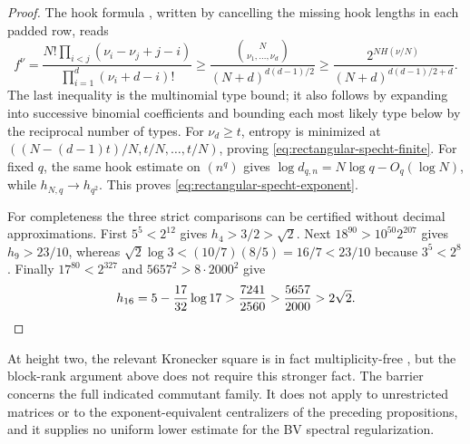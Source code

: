 \begin{proof}
The hook formula \cite[Section~1, pp.~1--2]{Stanley2004rectangular},
written by cancelling the missing hook lengths in each padded row, reads
\[
 f^\nu=
 \frac{N!\prod_{i<j}(\nu_i-\nu_j+j-i)}
      {\prod_{i=1}^d(\nu_i+d-i)!}
 \ge\frac{\binom{N}{\nu_1,\ldots,\nu_d}}
            {(N+d)^{d(d-1)/2}}
 \ge\frac{2^{NH(\nu/N)}}{(N+d)^{d(d-1)/2+d}}.
\]
The last inequality is the multinomial type bound; it also follows
by expanding into successive binomial coefficients and bounding
each most likely type below by the reciprocal number of types.
For $\nu_d\ge t$, entropy is minimized at
$((N-(d-1)t)/N,t/N,\ldots,t/N)$, proving
\eqref{eq:rectangular-specht-finite}.
For fixed $q$, the same hook estimate on $(n^q)$ gives
$\log d_{q,n}=N\log q-O_q(\log N)$, while
$h_{N,q}\to h_{q^2}$. This proves
\eqref{eq:rectangular-specht-exponent}.

For completeness the three strict comparisons can be certified
without decimal approximations. First $5^5<2^{12}$ gives
$h_4>3/2>\sqrt2$. Next
$18^{90}>10^{50}2^{207}$ gives $h_9>23/10$, whereas
$\sqrt2\log3<(10/7)(8/5)=16/7<23/10$ because $3^5<2^8$.
Finally $17^{80}<2^{327}$ and $5657^2>8\cdot2000^2$ give
\[
 h_{16}=5-\frac{17}{32}\log17
   >\frac{7241}{2560}>\frac{5657}{2000}>2\sqrt2.\qedhere
\]
\end{proof}

At height two, the relevant Kronecker square is in fact
multiplicity-free \cite[Theorem~1; proof in Section~3]{Manivel2010},
but the block-rank argument above does not require this stronger
fact. The barrier concerns the full indicated commutant family.
It does not apply to unrestricted matrices or to the exponent-equivalent
centralizers of the preceding propositions, and it supplies no
uniform lower estimate for the BV spectral regularization.
